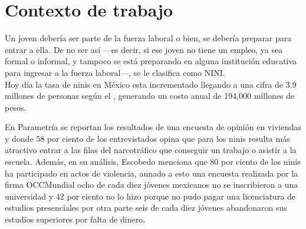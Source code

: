 \section{Contexto de trabajo}


Un joven debería ser parte de la fuerza laboral o bien, se debería preparar para entrar a ella. De no ser así —es decir, si ese joven no tiene un empleo, ya sea formal o informal, y tampoco se está preparando en alguna institución educativa para ingresar a la fuerza laboral—, se le clasifica como NINI. \\

Hoy día la tasa de ninis en México esta incrementado llegando a una cifra de 3.9 millones de personas según el \cite{INEGI} \cite{OECD2}, generando un costo anual de 194,000 millones de pesos.

 En Parametría se reportan los resultados de una encuesta de opinión en viviendas y donde 58 por ciento de los entrevistados opina que para los ninis resulta más atractivo entrar a las filas del narcotráfico que conseguir un trabajo o asistir a la escuela. \cite{Parametria} Además, en su análisis, Escobedo \cite{JEB} menciona que 80 por ciento de los ninis ha participado en actos de violencia, aunado a esto una encuesta realizada por la firma OCCMundial ocho de cada diez jóvenes mexicanos no se inscribieron a una universidad y 42 por ciento no lo hizo porque no pudo pagar una licenciatura de estudios presenciales por otra parte seis de cada diez jóvenes abandonaron sus estudios superiores por falta de dinero. \cite{OCC} \cite{Forbes_Universidad} \\
 \bigskip
